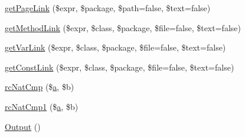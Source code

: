 \begin{DoxyCompactItemize}
\item 
\hyperlink{class_h_t_m_lframes_converter_aad8f419498310968275cbd3658e75c90}{get\-Page\-Link} (\$expr, \$package, \$path=false, \$text=false)
\item 
\hyperlink{class_h_t_m_lframes_converter_a23ab6aa7d92e8ca1cb398a8201d0bd61}{get\-Method\-Link} (\$expr, \$class, \$package, \$file=false, \$text=false)
\item 
\hyperlink{class_h_t_m_lframes_converter_a5a0a06a811d1135f4a05c79fb74909db}{get\-Var\-Link} (\$expr, \$class, \$package, \$file=false, \$text=false)
\item 
\hyperlink{class_h_t_m_lframes_converter_ad028169d32b0a0293c8bf2fbbff60594}{get\-Const\-Link} (\$expr, \$class, \$package, \$file=false, \$text=false)
\item 
\hyperlink{class_h_t_m_lframes_converter_a669301a557a996bf338badc5ca253156}{rc\-Nat\-Cmp} (\$\hyperlink{classa}{a}, \$b)
\item 
\hyperlink{class_h_t_m_lframes_converter_ac75bdbfec92cd3025b5bdb5f60e14970}{rc\-Nat\-Cmp1} (\$\hyperlink{classa}{a}, \$b)
\item 
\hyperlink{class_h_t_m_lframes_converter_a356172c336fe8c0afbac8c49d5dcc703}{\-Output} ()
\end{DoxyCompactItemize}

